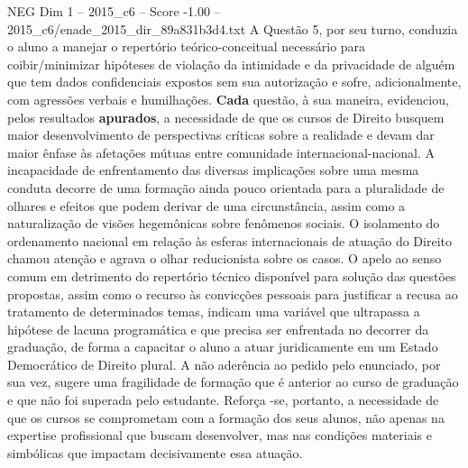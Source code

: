 \begin{textsample}{NEG Dim 1 – 2015\_c6 – Score -1.00 – 2015\_c6/enade\_2015\_dir\_89a831b3d4.txt}
A Questão 5, por seu turno, conduzia o aluno a manejar o repertório teórico-conceitual necessário para coibir/minimizar hipóteses de violação da intimidade e da privacidade de alguém que tem dados confidenciais expostos sem sua autorização e sofre, adicionalmente, com agressões verbais e humilhações. \textbf{Cada} questão, à sua maneira, evidenciou, pelos resultados \textbf{apurados}, a necessidade de que os cursos de Direito busquem maior desenvolvimento de perspectivas críticas sobre a realidade e devam dar maior ênfase às afetações mútuas entre comunidade internacional-nacional.
A incapacidade de enfrentamento das diversas implicações sobre uma mesma conduta decorre de uma formação ainda pouco orientada para a pluralidade de olhares e efeitos que podem derivar de uma circunstância, assim como a naturalização de visões hegemônicas sobre fenômenos sociais.
O isolamento do ordenamento nacional em relação às esferas internacionais de atuação do Direito chamou atenção e agrava o olhar reducionista sobre os casos.
O apelo ao senso comum em detrimento do repertório técnico disponível para solução das questões propostas, assim como o recurso às convicções pessoais para justificar a recusa ao tratamento de determinados temas, indicam uma variável que ultrapassa a hipótese de lacuna programática e que precisa ser enfrentada no decorrer da graduação, de forma a capacitar o aluno a atuar juridicamente em um Estado Democrático de Direito plural.
A não aderência ao pedido pelo enunciado, por sua vez, sugere uma fragilidade de formação que é anterior ao curso de graduação e que não foi superada pelo estudante.
Reforça -se, portanto, a necessidade de que os cursos se comprometam com a formação dos seus alunos, não apenas na expertise profissional que buscam desenvolver, mas nas condições materiais e simbólicas que impactam decisivamente essa atuação.

\end{textsample}
